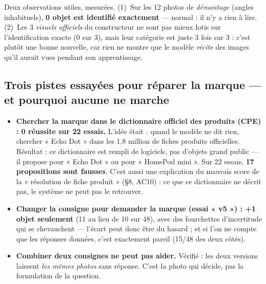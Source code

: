\documentclass[10pt,a4paper]{article}
\providecommand{\NoAutoSpacing}{}
\newcommand{\code}[1]{{\NoAutoSpacing\ttfamily\detokenize{#1}}}
\begin{document}
Deux observations utiles, mesurées. (1)~Sur les 12 photos de \emph{démontage} (angles
inhabituels), \textbf{0 objet est identifié exactement} — normal : il n'y a rien à lire.
(2)~Les 3 \emph{visuels officiels} du constructeur ne sont pas mieux lotis sur l'identification
exacte (0 sur 3), mais leur catégorie est juste 3 fois sur 3 : c'est plutôt une bonne nouvelle,
car rien ne montre que le modèle \emph{récite} des images qu'il aurait vues pendant son
apprentissage.

\subsection{Trois pistes essayées pour réparer la marque — et pourquoi aucune ne marche}
\begin{itemize}
\item \textbf{Chercher la marque dans le dictionnaire officiel des produits (CPE) : 0 réussite sur
22 essais.} L'idée était : quand le modèle ne dit rien, chercher « Echo Dot » dans les 1,8 million
de fiches produits officielles. Résultat : ce dictionnaire est rempli de logiciels, pas d'objets
grand public — il propose \code{dnnsoftware} pour « Echo Dot » ou \code{minio} pour « HomePod
mini ». Sur 22 essais, \textbf{17 propositions sont fausses}. C'est aussi une explication du
mauvais score de la « résolution de fiche produit » (§8, AC10) : ce que ce dictionnaire ne décrit
pas, le système ne peut pas le retrouver.
\item \textbf{Changer la consigne pour demander la marque (essai « v5 ») : +1 objet seulement}
(11 au lieu de 10 sur 48), avec des fourchettes d'incertitude qui se chevauchent — l'écart peut
donc être du hasard ; et si l'on ne compte que les réponses données, c'est exactement pareil
(15/48 des deux côtés).
\item \textbf{Combiner deux consignes ne peut pas aider.} Vérifié : les deux versions laissent
\emph{les mêmes photos} sans réponse. C'est la photo qui décide, pas la formulation de la question.
\end{itemize}
\end{document}
